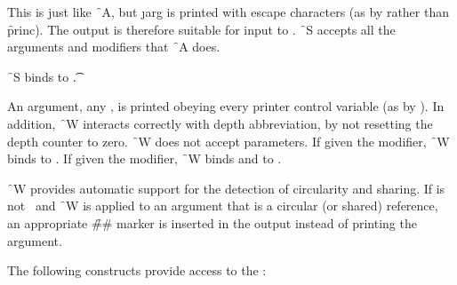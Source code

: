 


This is just like \f{~A}, but \j{arg} is printed with escape
characters (as by  rather than \f{princ}).  The output is
therefore suitable for input to .  \f{~S} accepts
all the arguments and modifiers that \f{~A} does.

\f{~S} binds  to \t.

\endsubsubsection%


An argument, any , is printed obeying every printer control
variable (as by ).  In addition, \f{~W} interacts correctly with depth
abbreviation, by not resetting the depth counter to zero.  \f{~W} does not
accept parameters.  If given the  modifier, \f{~W} binds 
to .  If given the  modifier, \f{~W} binds 
and  to \nil.
 
\f{~W} provides automatic support for the detection of circularity and
sharing.  If  is not \nil\ and \f{~W} is applied
to an argument that is a circular (or shared) reference, an appropriate 
\f{\#\#} marker is inserted in the output instead of printing the argument.
 
\endsubsubsection%

\endsubsection%



The following constructs provide access to the :


